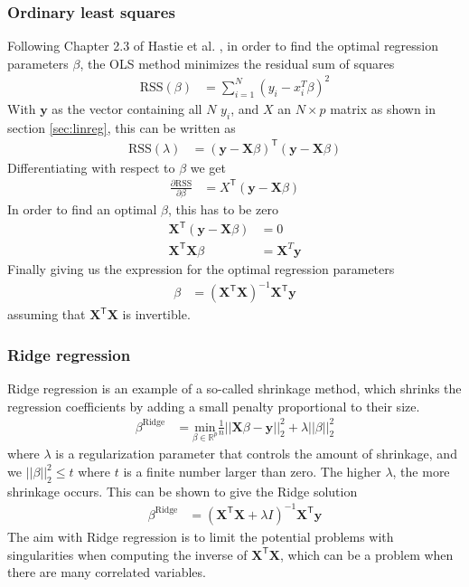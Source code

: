 \documentclass[a4paper]{article}
\newcommand\pd[2]{\frac{\partial #1}{\partial #2}}
\newcommand{\XX}{\mathbf{X}}
\newcommand{\T}{\mathsf{T}}
\begin{document}
\subsubsection{Ordinary least squares}
Following Chapter 2.3 of Hastie et al. \cite{Hastie}, in order to find the optimal regression parameters $\beta$, the OLS method minimizes the residual sum of squares
\begin{align*}
	\text{RSS}(\beta) &= \sum_{i=1}^N(y_i-x_i^T\beta)^2
\end{align*}
With $\bm{y}$ as the vector containing all $N$ $y_i$, and $X$ an $N\times p$ matrix as shown in section \ref{sec:linreg}, this can be written as
\begin{align*}
	\text{RSS}(\lambda) &= (\bm{y} - \XX\beta)^\T(\bm{y}-\XX\beta)
\end{align*}
Differentiating with respect to $\beta$ we get
\begin{align*}
	\pd{\text{RSS}}{\beta} &= X^\T(\bm{y}-\XX\beta)
\end{align*}
In order to find an optimal $\beta$, this has to be zero
\begin{align*}
	\XX^\T(\bm{y}-\XX\beta) &= 0\\
	\XX^\T\XX\beta &= \XX^T\bm{y}
\end{align*}
Finally giving us the expression for the optimal regression parameters
\begin{align*}
	\beta &= (\XX^\T\XX)^{-1}\XX^\T\bm{y}
\end{align*}
assuming that $\XX^\T\XX$ is invertible.

\subsubsection{Ridge regression}
Ridge regression is an example of a so-called shrinkage method, which shrinks the regression coefficients by adding a small penalty proportional to their size.
\begin{align*}
	\beta^{\text{Ridge}} &= \underset{\beta\in \mathbb{R}^{p}}{\text{min}}\frac{1}{n}||\bm{X}\beta - \bm{y}||^2_2 + \lambda||\beta||^2_2
\end{align*}
where $\lambda$ is a regularization parameter that controls the amount of shrinkage, and we $||\beta||^2_2 \leq t$ where $t$ is a finite number larger than zero. The higher $\lambda$, the more shrinkage occurs. This can be shown to give the Ridge solution
\begin{align*}
	\beta^{\text{Ridge}} &= (\XX^\T\XX + \lambda I)^{-1}\XX^\T\bm{y}
\end{align*}
The aim with Ridge regression is to limit the potential problems with singularities when computing the inverse of $\XX^\T\XX$, which can be a problem when there are many correlated variables.
\end{document}
